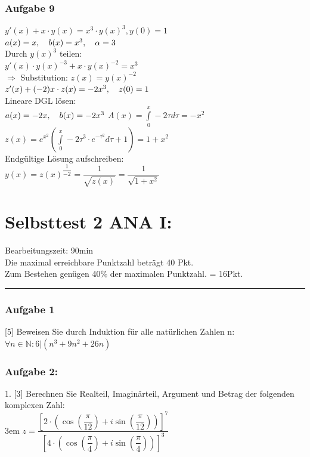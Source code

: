 \documentclass[11pt,final]{scrreprt}
\newcommand{\br} {\medskip\\}
\newcommand{\gbr} {\bigskip\\}
\newcommand{\N} {\mathbb N}
\begin{document}
\subsection*{Aufgabe 9}
$y'(x)+x\cdot y(x)=x^3\cdot y(x)^3, y(0)=1$\\
$a(x) = x , \hspace*{1em}b(x) = x^3 , \hspace*{1em}\alpha = 3$\br
Durch $y(x)^3$ teilen:\\
$y'(x)\cdot y(x)^{-3} + x\cdot y(x)^{-2} = x^3$\gbr
$\Rightarrow $ Substitution: $z(x) = y(x)^{-2}$\\
$ z'(x) + (-2)x\cdot z(x) = -2x^3, \hspace*{1em} z(0) = 1 $\gbr
Lineare DGL lösen:\\
$ a(x) = -2x , \hspace*{1em}b(x) = -2x^3 $
$ A(x) = \int\limits_0^x -2\tau d\tau = -x^2 $\\
$ z(x) = e^{x^2}\left( \int\limits_0^x -2\tau^3\cdot e^{-\tau^2} d\tau + 1 \right) = 1+x^2 $\gbr
Endgültige Lösung aufschreiben:\\
$y(x) = z(x)^{\dfrac{1}{-2}} = \dfrac{1}{\sqrt{z(x)}} = \dfrac{1}{\sqrt{1+x^2}}$

\chapter{Selbsttest 2 ANA I:}
Bearbeitungszeit: 90min\\
Die maximal erreichbare Punktzahl beträgt 40 Pkt.\\
Zum Bestehen genügen 40\% der maximalen Punktzahl. = 16Pkt.\hrule

\subsection*{Aufgabe 1}
[5] Beweisen Sie durch Induktion für alle natürlichen Zahlen n:\\
$ \forall n \in \N: 6 | (n^3 + 9n^2 + 26n) $\\

\subsection*{Aufgabe 2:}

1. [3] Berechnen Sie Realteil, Imaginärteil, Argument und Betrag der folgenden komplexen Zahl:\\

\begingroup
\leftskip3em 
$ z = \dfrac{\left[  2\cdot (\cos(\dfrac{\pi}{12})+i\sin(\dfrac{\pi}{12}))\right]^7}{\left[  4\cdot (\cos(\dfrac{\pi}{4})+i\sin(\dfrac{\pi}{4}))\right]^3} $\\
\par	
\endgroup 
\end{document}
